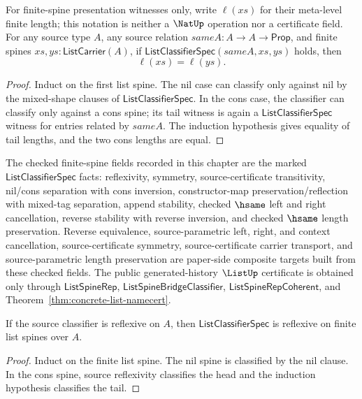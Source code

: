 \begin{theorem}
\label{thm:list-classifier-length-eq}
For finite-spine presentation witnesses only, write $\ell(xs)$ for their meta-level finite length; this notation is neither a $\NatUp$ operation nor a certificate field. For any source type $A$, any source relation $sameA:A\to A\to\mathsf{Prop}$, and finite spines $xs,ys:\mathsf{ListCarrier}(A)$, if
$\mathsf{ListClassifierSpec}(sameA,xs,ys)$ holds, then
$$
\ell(xs)=\ell(ys).
$$
\end{theorem}
\begin{proof}
Induct on the first list spine. The nil case can classify only against nil by the mixed-shape clauses of $\mathsf{ListClassifierSpec}$. In the cons case, the classifier can classify only against a cons spine; its tail witness is again a $\mathsf{ListClassifierSpec}$ witness for entries related by $sameA$. The induction hypothesis gives equality of tail lengths, and the two cons lengths are equal.
\end{proof}

\begin{definition}
\label{def:list-stability-certificate}
The checked finite-spine fields recorded in this chapter are the marked $\mathsf{ListClassifierSpec}$ facts:
reflexivity, symmetry, source-certificate transitivity, nil/cons separation with cons inversion,
constructor-map preservation/reflection with mixed-tag separation, append stability,
checked $\hsame$ left and right cancellation, reverse stability with reverse inversion, and checked $\hsame$ length preservation.
Reverse equivalence, source-parametric left, right, and context cancellation,
source-certificate symmetry, source-certificate carrier transport, and source-parametric length preservation are paper-side composite targets built from these checked fields.
The public generated-history $\ListUp$ certificate is obtained only through $\mathsf{ListSpineRep}$,
$\mathsf{ListSpineBridgeClassifier}$, $\mathsf{ListSpineRepCoherent}$, and Theorem~\ref{thm:concrete-list-namecert}.
\end{definition}

\begin{theorem}
\label{thm:list-classifier-reflexivity}
If the source classifier is reflexive on $A$, then $\mathsf{ListClassifierSpec}$ is reflexive on finite list spines over $A$.
\end{theorem}
\begin{proof}
Induct on the finite list spine. The nil spine is classified by the nil clause. In the cons spine, source reflexivity classifies the head and the induction hypothesis classifies the tail.
\end{proof}

